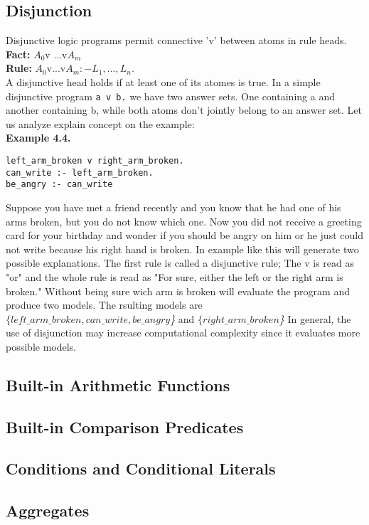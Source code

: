 \documentclass[14pt,a4paper, titlepage]{article}
\begin{document}
\subsection{Disjunction}
Disjunctive logic programs permit connective 'v' between atoms in rule heads.\\ \textbf{Fact:} $A_0$v ...v$A_m$
\\ \textbf{Rule:} $A_0$v...v$A_m :- L_1,...,L_n. $
\\ A disjunctive head holds if at least one of its atomes is true. In a simple disjunctive program \texttt{a v b.} we have two answer sets. One containing a and another containing b, while both atoms don't jointly belong to an answer set. Let us analyze explain concept on the example:
\\ \textbf{Example 4.4.}
\begin{lstlisting}
left_arm_broken v right_arm_broken.
can_write :- left_arm_broken.
be_angry :- can_write
\end{lstlisting}
Suppose you have met a friend recently and you know that he had one of his arms broken, but you do not know which one. Now you did not receive a greeting card for your birthday and wonder if you should be angry on him or he just could not write because his right hand is broken. In example like this \dlvhex{} will generate two possible explanations. The first rule is called a disjunctive rule; The v is read as "or" and the whole rule is read as "For sure, either the left or the right arm is broken." Without being sure wich arm is broken \dlvhex{} will evaluate the program and produce two models. The rsulting models are \textit{$\{left\_arm\_broken, can\_write, be\_angry$\}} and \textit{$\{right\_arm\_broken$\}}  
In general, the use of disjunction may increase computational complexity since it evaluates more possible models.    

    
\subsection{Built-in Arithmetic Functions}
\subsection{Built-in Comparison Predicates}
\subsection{Conditions and Conditional Literals}
\subsection{Aggregates}
\end{document}
